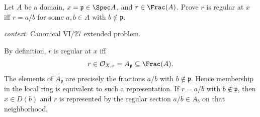 \begin{problem}\label{prob:vi27-p19}
Let \(A\) be a domain, \(x=\mathfrak p\in\Spec A\), and \(r\in\Frac(A)\). Prove \(r\) is regular at \(x\) iff \(r=a/b\) for some \(a,b\in A\) with \(b\notin\mathfrak p\).
\par\smallskip\noindent\textit{context.} Canonical VI/27 extended problem.
\end{problem}

\ifdefined\FullProblemDossiers
\begin{solution}
By definition, \(r\) is regular at \(x\) iff
\[
r\in\mathcal O_{X,x}=A_{\mathfrak p}\subseteq\Frac(A).
\]
The elements of \(A_{\mathfrak p}\) are precisely the fractions \(a/b\) with \(b\notin\mathfrak p\). Hence
membership in the local ring is equivalent to such a representation. If \(r=a/b\) with \(b\notin\mathfrak p\),
then \(x\in D(b)\) and \(r\) is represented by the regular section \(a/b\in A_b\) on that neighborhood.
\end{solution}
\fi
